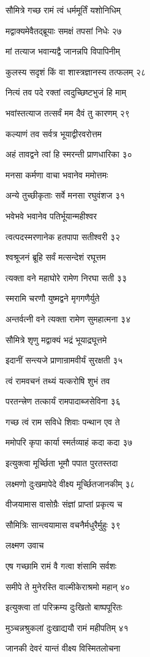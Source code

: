 सौमित्रे गच्छ रामं त्वं धर्ममूर्तिं यशोनिधिम्

मद्वाक्यमेवैतद्ब्रूयाः समक्षं तपसां निधेः २७

मां तत्याज भवान्यद्वै जानन्नपि विपापिनीम्

कुलस्य सदृशं किं वा शास्त्रज्ञानस्य तत्फलम् २८

नित्यं तव पदे रक्तां त्वदुच्छिष्टभुजं हि माम्

भवांस्तत्याज तत्सर्वं मम दैवं तु कारणम् २९

कल्याणं तव सर्वत्र भूयाद्वीरवरोत्तम

अहं तावद्वने त्वां हि स्मरन्ती प्राणधारिका ३०

मनसा कर्मणा वाचा भवानेव ममोत्तमः

अन्ये तुच्छीकृताः सर्वे मनसा रघुवंशज ३१

भवेभवे भवानेव पतिर्भूयान्महीश्वर

त्वत्पदस्मरणानेक हतपापा सतीश्वरी ३२

श्वश्रूजनं ब्रूहि सर्वं मत्सन्देशं रघूत्तम

त्यक्ता वने महाघोरे रामेण निरघा सती ३३

स्मरामि चरणौ युष्मद्वने मृगगणैर्युते

अन्तर्वत्नी वने त्यक्ता रामेण सुमहात्मना ३४

सौमित्रे शृणु मद्वाक्यं भद्रं भूयाद्रघूत्तमे

इदानीं सन्त्यजे प्राणान्रामवीर्यं सुरक्षती ३५

त्वं रामवचनं तथ्यं यत्करोषि शुभं तव

परतन्त्त्रेण तत्कार्यं रामपादाब्जसेविना ३६

गच्छ त्वं राम सविधे शिवाः पन्थान एव ते

ममोपरि कृपा कार्या स्मर्तव्याहं कदा कदा ३७

इत्युक्त्वा मूर्च्छिता भूमौ पपात पुरतस्तदा

लक्ष्मणो दुःखमापेदे वीक्ष्य मूर्च्छितजानकीम् ३८

वीजयामास वासोग्रैः संज्ञां प्राप्तां प्रकृत्य च

सौमित्रिः सान्त्वयामास वचनैर्मधुरैर्मुहुः ३९

लक्ष्मण उवाच

एष गच्छामि रामं वै गत्वा शंसामि सर्वशः

समीपे ते मुनेरस्ति वाल्मीकेराश्रमो महान् ४०

इत्युक्त्वा तां परिक्रम्य दुःखितो बाष्पपूरितः

मुञ्चन्नश्रुकलां दुःखाद्ययौ रामं महीपतिम् ४१

जानकी देवरं यान्तं वीक्ष्य विस्मितलोचना

